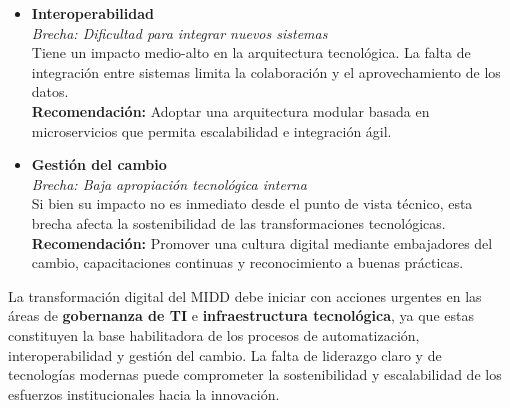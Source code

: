 \begin{itemize}
    \item \textbf{Interoperabilidad} \\
    \textit{Brecha: Dificultad para integrar nuevos sistemas} \\
    Tiene un impacto medio-alto en la arquitectura tecnológica. La falta de integración entre sistemas limita la colaboración y el aprovechamiento de los datos. \\
    \textbf{Recomendación:} Adoptar una arquitectura modular basada en microservicios que permita escalabilidad e integración ágil.

    \item \textbf{Gestión del cambio} \\
    \textit{Brecha: Baja apropiación tecnológica interna} \\
    Si bien su impacto no es inmediato desde el punto de vista técnico, esta brecha afecta la sostenibilidad de las transformaciones tecnológicas. \\
    \textbf{Recomendación:} Promover una cultura digital mediante embajadores del cambio, capacitaciones continuas y reconocimiento a buenas prácticas.
\end{itemize}

La transformación digital del MIDD debe iniciar con acciones urgentes en las áreas de \textbf{gobernanza de TI} e \textbf{infraestructura tecnológica}, ya que estas constituyen la base habilitadora de los procesos de automatización, interoperabilidad y gestión del cambio. La falta de liderazgo claro y de tecnologías modernas puede comprometer la sostenibilidad y escalabilidad de los esfuerzos institucionales hacia la innovación.

